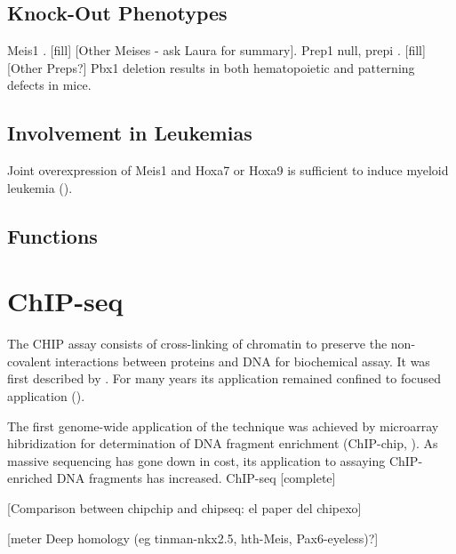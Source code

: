 \subsection{Knock-Out Phenotypes}

		Meis1  \cite{Azcoitia2005, Carramolino2010}. [fill] [Other Meises - ask Laura for summary]. 
		Prep1 null, \ac{prepi} \cite{Ferretti2006, Fernandez-Diaz2010, Longobardi2010}. [fill] [Other Preps?]
		Pbx1 deletion results in both hematopoietic \cite{DiMartino2001} and patterning \cite{Selleri et al. 2001} defects in mice.
		
\subsection{Involvement in Leukemias}
Joint overexpression of Meis1 and Hoxa7 or Hoxa9 is sufficient to induce myeloid leukemia (\cite{Nakamura1996}).

\subsection{Functions}

\section{ChIP-seq}


The \ac{CHIP} assay consists of cross-linking of chromatin to preserve the non-covalent interactions between proteins and DNA for biochemical assay. It was first described by \cite{Solomon1988}. For many years its application remained confined to focused application (\cite{Mardis2007}).  

The first genome-wide application of the technique was achieved by microarray hibridization for determination of DNA fragment enrichment (ChIP-chip, \cite{Ren2000}). As massive sequencing has gone down in cost, its application to assaying ChIP-enriched DNA fragments has increased. ChIP-seq \cite{Robertson2007} [complete]

[Comparison between chipchip and chipseq: el paper del chipexo]




[meter Deep homology (eg tinman-nkx2.5, hth-Meis, Pax6-eyeless)?]
